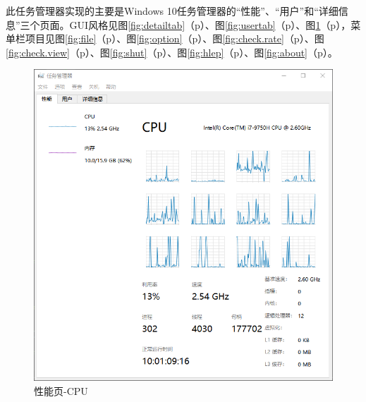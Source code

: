 \documentclass[UTF8,twoside,titlepage]{ctexart}
\newcommand\myref[1]{\ref{#1}（p\pageref{#1}）}
\begin{document}
此任务管理器实现的主要是Windows 10任务管理器的``性能''、``用户''和``详细信息''三个页面。GUI风格见图\myref{fig:detailtab}、图\myref{fig:usertab}、图\myref{fig:perftab}，菜单栏项目见图\myref{fig:file}、图\myref{fig:option}、图\myref{fig:check.rate}、图\myref{fig:check.view}、图\myref{fig:shut}、图\myref{fig:hlep}、图\myref{fig:about}。

\begin{figure}[htb]
    \centering
    \includegraphics[scale=0.75]{../media/tabs/perfTab/cpu.png}
    \caption{性能页-CPU}
    \label{fig:perftab}
\end{figure}
\end{document}

